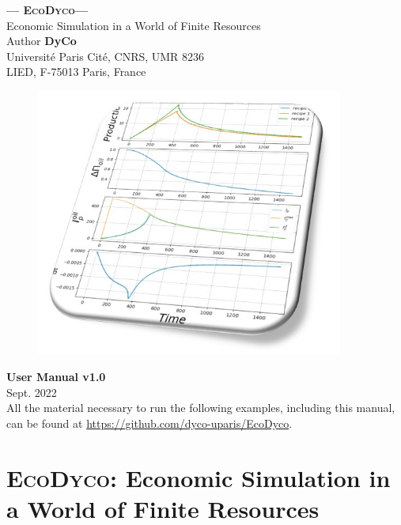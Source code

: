\documentclass[12pt,a4paper]{article}%
\date{}
\newcommand{\ed}{\textsc{EcoDyco}}
\begin{document}
\begin{titlepage}

	\centering
		{\Huge \textbf{--- \ed ---} \\[0pt]}
		{\Large Economic Simulation in a World of Finite Resources \\[1cm]}
		\Large Author \textbf{DyCo} \\ 
		\large Universit\'e Paris Cit\'e, CNRS, UMR 8236 \\
		 LIED, F-75013 Paris, France
		\vspace{1cm}

		\begin{figure}[h]
			\centering \includegraphics[width=0.9\textwidth]{figures/couverture.jpg}
		\end{figure}
	
		\vspace{1cm}
		{\Huge \textbf{User Manual v1.0} \\[0.5cm]}
		{\Large Sept. 2022 \\[0.5cm]}
		{\large All the material necessary to run the following examples, including this manual, can be found at \url{https://github.com/dyco-uparis/EcoDyco}. 
		}

\end{titlepage}
\restoregeometry

\tableofcontents
\setcounter{page}{1}

\newpage

\section{\ed: Economic Simulation in a World of Finite Resources}
\end{document}
